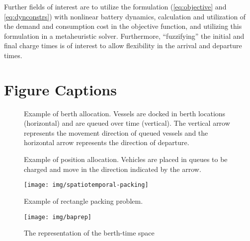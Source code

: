 \documentclass[utf8]{FrontiersinHarvard}
\begin{document}
Further fields of interest are to utilize the formulation (\autoref{eq:objective} and \autoref{eq:dynconstrs}) with
nonlinear battery dynamics, calculation and utilization of the demand and consumption cost in the objective function,
and utilizing this formulation in a metaheuristic solver. Furthermore, ``fuzzifying'' the initial and final charge times
is of interest to allow flexibility in the arrival and departure times.




\nolinenumbers
\clearpage

\section{Figure Captions}
\label{sec:orgdb0d254}

\begin{subfigures}
    \begin{figure}[htpb]
    \centering
        
        \caption{Example of berth allocation. Vessels are docked in berth locations (horizontal) and are queued over
          time (vertical). The vertical arrow represents the movement direction of queued vessels and the horizontal
          arrow represents the direction of departure.}
        \label{subfig:bapexample}
    \end{figure}
    \hfill

    \begin{figure}[htpb]
    \centering
        
        \caption{Example of position allocation. Vehicles are placed in queues to be charged and move in the direction
          indicated by the arrow.}
        \label{subfig:papexample}
    \end{figure}
\end{subfigures}




\begin{figure}[htpb]
\centering
    \texttt{[image: img/spatiotemporal-packing]}
    \caption{Example of rectangle packing problem.}
    \label{fig:packexample}
\end{figure}

\begin{figure}[ht]
\centering
    \texttt{[image: img/baprep]}
    \caption{The representation of the berth-time space}
    \label{fig:bap}
\end{figure}
\end{document}
